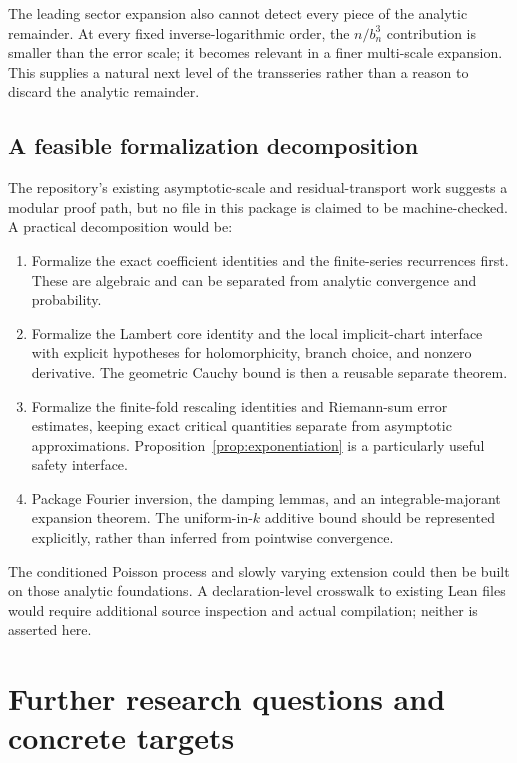 \documentclass[11pt,a4paper]{article}
\numberwithin{equation}{section}
\theoremstyle{definition}
\theoremstyle{remark}
\begin{document}
The leading sector expansion also cannot detect every piece of the
analytic remainder. At every fixed inverse-logarithmic order, the
$n/b_n^3$ contribution is smaller than the error scale; it becomes
relevant in a finer multi-scale expansion. This supplies a natural
next level of the transseries rather than a reason to discard the
analytic remainder.

\subsection{A feasible formalization decomposition}
The repository's existing asymptotic-scale and residual-transport work
suggests a modular proof path, but no file in this package is claimed
to be machine-checked. A practical decomposition would be:
\begin{enumerate}[label=\arabic*.]
\item Formalize the exact coefficient identities and the finite-series
recurrences first. These are algebraic and can be separated from
analytic convergence and probability.
\item Formalize the Lambert core identity and the local implicit-chart
interface with explicit hypotheses for holomorphicity, branch choice,
and nonzero derivative. The geometric Cauchy bound is then a reusable
separate theorem.
\item Formalize the finite-fold rescaling identities and Riemann-sum
error estimates, keeping exact critical quantities separate from
asymptotic approximations. Proposition~\ref{prop:exponentiation}
is a particularly useful safety interface.
\item Package Fourier inversion, the damping lemmas, and an
integrable-majorant expansion theorem. The uniform-in-$k$ additive
bound should be represented explicitly, rather than inferred from
pointwise convergence.
\end{enumerate}
The conditioned Poisson process and slowly varying extension could then
be built on those analytic foundations. A declaration-level crosswalk
to existing Lean files would require additional source inspection and
actual compilation; neither is asserted here.

\section{Further research questions and concrete targets}
\label{sec:questions}
\end{document}
